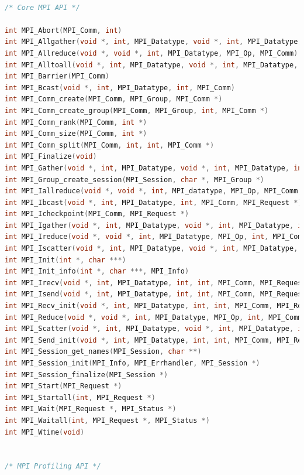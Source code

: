 \documentclass{article}
\begin{document}
\begin{lstlisting}[language=C]

/* Core MPI API */

int MPI_Abort(MPI_Comm, int)
int MPI_Allgather(void *, int, MPI_Datatype, void *, int, MPI_Datatype, MPI_Comm)
int MPI_Allreduce(void *, void *, int, MPI_Datatype, MPI_Op, MPI_Comm)
int MPI_Alltoall(void *, int, MPI_Datatype, void *, int, MPI_Datatype, MPI_Comm)
int MPI_Barrier(MPI_Comm)
int MPI_Bcast(void *, int, MPI_Datatype, int, MPI_Comm)
int MPI_Comm_create(MPI_Comm, MPI_Group, MPI_Comm *)
int MPI_Comm_create_group(MPI_Comm, MPI_Group, int, MPI_Comm *)
int MPI_Comm_rank(MPI_Comm, int *)
int MPI_Comm_size(MPI_Comm, int *)
int MPI_Comm_split(MPI_Comm, int, int, MPI_Comm *)
int MPI_Finalize(void)
int MPI_Gather(void *, int, MPI_Datatype, void *, int, MPI_Datatype, int, MPI_Comm)
int MPI_Group_create_session(MPI_Session, char *, MPI_Group *)
int MPI_Iallreduce(void *, void *, int, MPI_datatype, MPI_Op, MPI_Comm, MPI_Request *)
int MPI_Ibcast(void *, int, MPI_Datatype, int, MPI_Comm, MPI_Request *)
int MPI_Icheckpoint(MPI_Comm, MPI_Request *)
int MPI_Igather(void *, int, MPI_Datatype, void *, int, MPI_Datatype, int, MPI_Comm, MPI_Request *)
int MPI_Ireduce(void *, void *, int, MPI_Datatype, MPI_Op, int, MPI_Comm, MPI_Request *)
int MPI_Iscatter(void *, int, MPI_Datatype, void *, int, MPI_Datatype, int, MPI_Comm, MPI_Request *)
int MPI_Init(int *, char ***)
int MPI_Init_info(int *, char ***, MPI_Info)
int MPI_Irecv(void *, int, MPI_Datatype, int, int, MPI_Comm, MPI_Request *)
int MPI_Isend(void *, int, MPI_Datatype, int, int, MPI_Comm, MPI_Request *)
int MPI_Recv_init(void *, int, MPI_Datatype, int, int, MPI_Comm, MPI_Request *)
int MPI_Reduce(void *, void *, int, MPI_Datatype, MPI_Op, int, MPI_Comm)
int MPI_Scatter(void *, int, MPI_Datatype, void *, int, MPI_Datatype, int, MPI_Comm)
int MPI_Send_init(void *, int, MPI_Datatype, int, int, MPI_Comm, MPI_Request *)
int MPI_Session_get_names(MPI_Session, char **)
int MPI_Session_init(MPI_Info, MPI_Errhandler, MPI_Session *)
int MPI_Session_finalize(MPI_Session *)
int MPI_Start(MPI_Request *)
int MPI_Startall(int, MPI_Request *)
int MPI_Wait(MPI_Request *, MPI_Status *)
int MPI_Waitall(int, MPI_Request *, MPI_Status *)
int MPI_Wtime(void)
 
 
/* MPI Profiling API */
 

\end{lstlisting}
\end{document}
